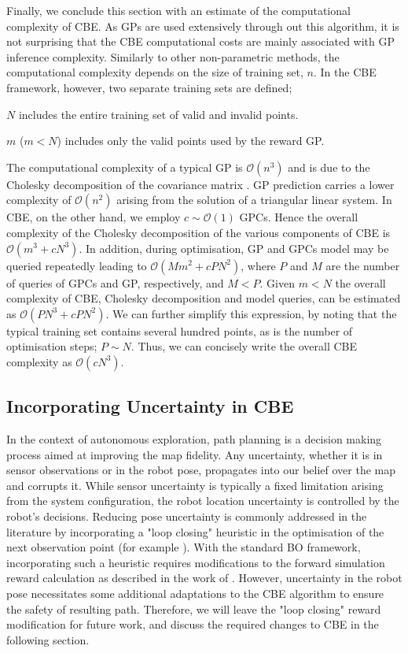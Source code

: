\documentclass[shortAfour,sageh,times]{sagej_no_sage}
\begin{document}
Finally, we conclude this section with an estimate of the computational complexity of CBE. As GPs are used extensively through out this algorithm, it is not surprising that the CBE computational costs are mainly associated with GP inference complexity. Similarly to other non-parametric methods, the computational complexity depends on the size of training set, $n$. In the CBE framework, however, two separate training sets are defined; 
\begin{inparaenum}[(i)]  
	\item $N$ includes the entire training set of valid and invalid points.
	\item $m$ ($m<N$) includes only the valid points used by the reward GP.
\end{inparaenum}
The computational complexity of a typical GP is $\mathcal{O}(n^3)$ and is due to the Cholesky decomposition of the covariance matrix \citep{Rasmussen2006}. GP prediction carries a lower complexity of $\mathcal{O}(n^2)$ arising from the solution of a triangular linear system. In CBE, on the other hand, we employ $c\sim \mathcal{O}(1)$ GPCs. Hence the overall complexity of the Cholesky decomposition of the various components of CBE is $\mathcal{O}(m^3+cN^3)$. In addition, during optimisation, GP and GPCs model may be queried repeatedly leading to $\mathcal{O}(Mm^2+cPN^2)$, where $P$ and $M$ are the number of queries of GPCs and GP, respectively, and $M<P$. 
Given $m<N$ the overall complexity of CBE, Cholesky decomposition and model queries, can be estimated as $\mathcal{O}(PN^3+cPN^2)$. We can further simplify this expression, by noting that the typical training set contains several hundred points, as is the number of optimisation steps; $P \sim N$. Thus, we can concisely write the overall CBE complexity as $\mathcal{O}(cN^3)$.
  

\subsection{Incorporating Uncertainty in CBE}
\label{subsec:Uncertain_CBE}


In the context of autonomous exploration, path planning is a decision making process aimed at improving the map fidelity. Any uncertainty, whether it is in sensor observations or in the robot pose, propagates into our belief over the map and corrupts it. While sensor uncertainty is typically a fixed limitation arising from the system configuration, the robot location uncertainty is controlled by the robot's decisions. Reducing pose uncertainty is commonly addressed in the literature by incorporating a "loop closing" heuristic in the optimisation of the next observation point (for example \citep{Makarenko2002,Indelman2015,Rafieisakhaei2016}). With the standard BO framework, incorporating such a heuristic requires modifications to the forward simulation reward calculation as described in the work of \citet{Martinez-Cantin2009}. However, uncertainty in the robot pose necessitates some additional adaptations to the CBE algorithm to ensure the safety of resulting path. Therefore, we will leave the "loop closing" reward modification for future work, and discuss the required changes to CBE in the following section.  
\end{document}
